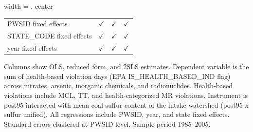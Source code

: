 \begin{table}[htbp]
\begin{adjustbox}{width = \textwidth, center}
\begin{tabular}{lccc}
          \\
         
         PWSID fixed effects                               & $\checkmark$  & $\checkmark$  & $\checkmark$\\   
         STATE\_CODE fixed effects                         & $\checkmark$  & $\checkmark$  & $\checkmark$\\   
         year fixed effects                                & $\checkmark$  & $\checkmark$  & $\checkmark$\\   
         
         \bottomrule
         
      \end{tabular}
      
      
      
   \end{adjustbox}
      {\tiny\linespread{1}\selectfont \par \raggedright 
   Columns show OLS, reduced form, and 2SLS estimates. Dependent variable is the sum of health-based violation days (EPA IS\_HEALTH\_BASED\_IND flag) across nitrates, arsenic, inorganic chemicals, and radionuclides. Health-based violations include MCL, TT, and health-categorized MR violations. Instrument is post95 interacted with mean coal sulfur content of the intake watershed (post95 x sulfur unified). All regressions include PWSID, year, and state fixed effects. Standard errors clustered at PWSID level. Sample period 1985--2005.}
   
\end{table}


